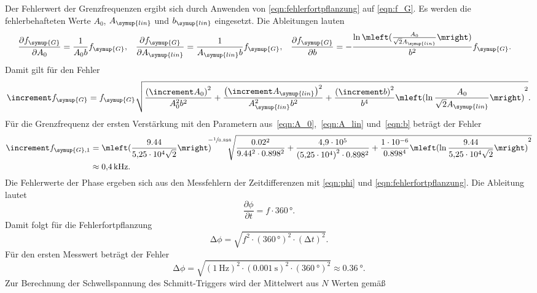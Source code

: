 Der Fehlerwert der Grenzfrequenzen ergibt sich durch Anwenden von \autoref{eqn:fehlerfortpflanzung} auf \autoref{eqn:f_G}. 
Es werden die fehlerbehafteten Werte $A_0$, $A_{\symup{lin}}$ und $b_{\symup{lin}}$ eingesetzt. 
Die Ableitungen lauten
\begin{align*}
  \frac{\partial f_{\symup{G}}}{\partial A_0} &= \frac{1}{A_0b}f_{\symup{G}}, & \frac{\partial f_{\symup{G}}}{\partial A_{\symup{lin}}} &= \frac{1}{A_{\symup{lin}}b}f_{\symup{G}}, & \frac{\partial f_{\symup{G}}}{\partial b} &= -\frac{\ln\mleft({\frac{A_0}{\sqrt{2}A_{\symup{lin}}}}\mright)}{b^2}f_{\symup{G}}.
\end{align*}
Damit gilt für den Fehler
\begin{equation*}
  \increment f_{\symup{G}} = f_{\symup{G}}\sqrt{\frac{{\left(\increment A_0\right)}^2}{A_0^2b^2} + \frac{{\left(\increment A_{\symup{lin}}\right)}^2}{A_{\symup{lin}}^2b^2} + \frac{{\left(\increment b\right)}^2}{b^4}{\mleft({\ln\frac{A_0}{\sqrt{2}A_{\symup{lin}}}}\mright)}^2}. 
\end{equation*}
Für die Grenzfrequenz der ersten Verstärkung mit den Parametern aus~\ref{eqn:A_0},~\ref{eqn:A_lin} und~\ref{eqn:b} beträgt der Fehler
\begin{align*}
  \increment f_{\symup{G},1} &= {\mleft(\frac{9.44}{\qty{5.25e4}{}\sqrt{2}}\mright)}^{\!\!\!-\sfrac{1}{0.898}}\!\!\!\sqrt{\frac{0.02^2}{9.44^2\cdot0.898^2} + \frac{\qty{4.9e5}{}}{{({\qty{5.25e4}{}})}^2\cdot 0.898^2} + \frac{\qty{1e-6}{}}{0.898^4}{\mleft(\ln{\frac{9.44}{\qty{5.25e4}{}\sqrt{2}}}\mright)}^2} \\
  &\approx \qty{0.4}{\kilo\hertz}.
\end{align*}
Die Fehlerwerte der Phase ergeben sich aus den Messfehlern der Zeitdifferenzen mit \autoref{eqn:phi} und \autoref{eqn:fehlerfortpflanzung}.
Die Ableitung lautet
\begin{equation*}
  \frac{\partial \phi}{\partial t} = f\cdot 360\,\unit{\degree}.
\end{equation*}
Damit folgt für die Fehlerfortpflanzung
\begin{equation*}
  \increment\phi = \sqrt{f^2\cdot{(360\,\unit{\degree})}^2\cdot{(\increment t)}^2}.
\end{equation*}
Für den ersten Messwert beträgt der Fehler 
\begin{equation*}
  \increment\phi = \sqrt{{(\qty{1}{\hertz})}^2\cdot {(\qty{0.001}{\second})}^2\cdot{(\qty{360}{\degree})}^2} \approx \qty{0.36}{\degree}.
\end{equation*}
Zur Berechnung der Schwellspannung des Schmitt-Triggers wird der Mittelwert aus $N$ Werten gemäß
